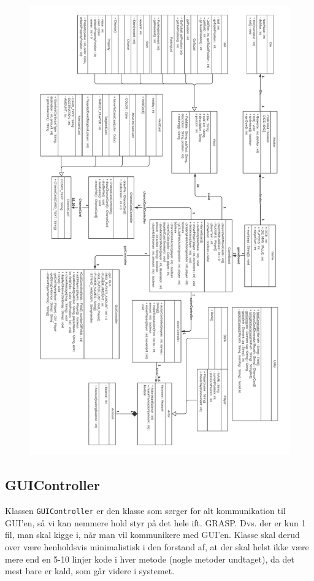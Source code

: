 \begin{figure}[h!]
\centering
\includegraphics[scale=0.16]{artifacts/CD.png}
\end{figure}

\subsection{GUIController}
Klassen \texttt{GUIController} er den klasse som sørger for alt kommunikation til GUI’en, så vi kan nemmere hold styr på det hele ift. GRASP.
Dvs. der er kun 1 fil, man skal kigge i, når man vil kommunikere med GUI’en.
Klasse skal derud over være henholdsvis minimalistisk i den forstand af, at der skal helst ikke være mere end en 5-10 linjer kode i hver metode (nogle metoder undtaget), da det mest bare er kald, som går videre i systemet.


